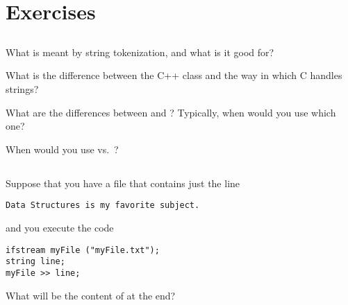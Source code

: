 \section{Exercises}

\subsection{\ReviewQuestions}
\begin{exercise}
  What is meant by string tokenization, and what is it good for?
\end{exercise}

\begin{exercise}
  What is the difference between the C++  class and the
  way in which C handles strings?
\end{exercise}

\begin{exercise}
  What are the differences between  and ?
  Typically, when would you use which one?
\end{exercise}

\begin{exercise}
  When would you use  vs.~?
\end{exercise}

\subsection{\EasyQuestions}

\begin{exercise}
  Suppose that you have a file  that contains just the line
\begin{verbatim}
Data Structures is my favorite subject.
\end{verbatim}
  and you execute the code
\begin{verbatim}
ifstream myFile ("myFile.txt");
string line;
myFile >> line;
\end{verbatim}
  What will be the content of  at the end?
\end{exercise}